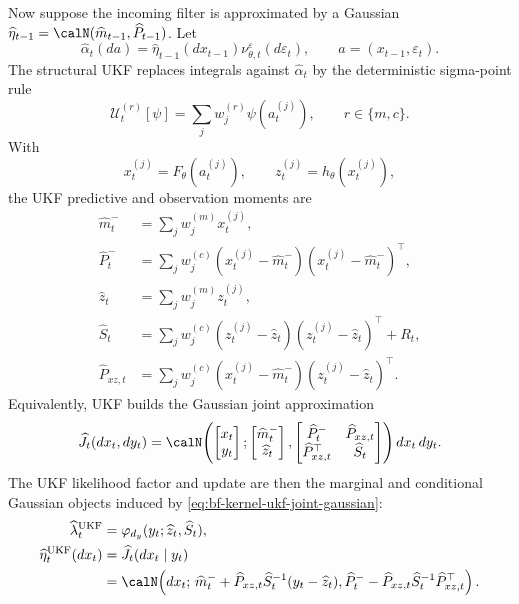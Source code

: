 Now suppose the incoming filter is approximated by a Gaussian
$\widehat\eta_{t-1}=\calN(\widehat m_{t-1},\widehat P_{t-1})$.  Let
\begin{equation}
  \widehat\alpha_t(da)
  =
  \widehat\eta_{t-1}(dx_{t-1})
  \nu_{\theta,t}^{\varepsilon}(d\varepsilon_t),
  \qquad
  a=(x_{t-1},\varepsilon_t).
\end{equation}
The structural UKF replaces integrals against $\widehat\alpha_t$ by the
deterministic sigma-point rule
\[
  \mathcal U_t^{(r)}[\psi]
  =
  \sum_j w_j^{(r)}\psi(a_t^{(j)}),
  \qquad r\in\{m,c\}.
\]
With
\[
  x_t^{(j)}=F_\theta(a_t^{(j)}),
  \qquad
  z_t^{(j)}=h_\theta(x_t^{(j)}),
\]
the UKF predictive and observation moments are
\begin{align}
  \widehat m_t^-
    &=
    \sum_j w_j^{(m)}x_t^{(j)},\\
  \widehat P_t^-
    &=
    \sum_j w_j^{(c)}
    (x_t^{(j)}-\widehat m_t^-)(x_t^{(j)}-\widehat m_t^-)^\top,
    \label{eq:bf-kernel-ukf-state-moments}\\
  \widehat z_t
    &=
    \sum_j w_j^{(m)}z_t^{(j)},\\
  \widehat S_t
    &=
    \sum_j w_j^{(c)}
    (z_t^{(j)}-\widehat z_t)(z_t^{(j)}-\widehat z_t)^\top
    +R_t,\\
  \widehat P_{xz,t}
    &=
    \sum_j w_j^{(c)}
    (x_t^{(j)}-\widehat m_t^-)(z_t^{(j)}-\widehat z_t)^\top .
    \label{eq:bf-kernel-ukf-observation-moments}
\end{align}
Equivalently, UKF builds the Gaussian joint approximation
\begin{equation}
  \widehat J_t(dx_t,dy_t)
  =
  \calN\!\left(
    \begin{bmatrix}x_t\\ y_t\end{bmatrix};
    \begin{bmatrix}\widehat m_t^-\\ \widehat z_t\end{bmatrix},
    \begin{bmatrix}
      \widehat P_t^- & \widehat P_{xz,t}\\
      \widehat P_{xz,t}^\top & \widehat S_t
    \end{bmatrix}
  \right)dx_t\,dy_t .
  \label{eq:bf-kernel-ukf-joint-gaussian}
\end{equation}
The UKF likelihood factor and update are then the marginal and conditional
Gaussian objects induced by \eqref{eq:bf-kernel-ukf-joint-gaussian}:
\begin{align}
  \widehat\lambda_t^{\mathrm{UKF}}
    &=
    \varphi_{d_y}(y_t;\widehat z_t,\widehat S_t),
    \label{eq:bf-kernel-ukf-likelihood-factor}\\
  \widehat\eta_t^{\mathrm{UKF}}(dx_t)
    &=
    \widehat J_t(dx_t\mid y_t) \nonumber\\
    &=
    \calN\!\left(
      dx_t;\,
      \widehat m_t^-+
      \widehat P_{xz,t}\widehat S_t^{-1}(y_t-\widehat z_t),
      \widehat P_t^--
      \widehat P_{xz,t}\widehat S_t^{-1}\widehat P_{xz,t}^\top
    \right).
    \label{eq:bf-kernel-ukf-gaussian-update}
\end{align}
